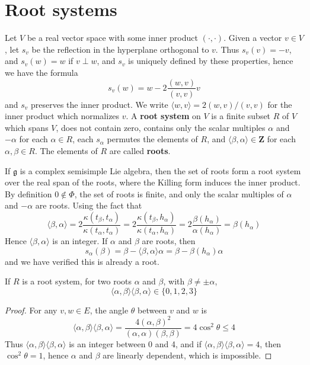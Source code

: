 \section{Root systems}

Let $V$ be a real vector space with some inner product $(\cdot,\cdot)$. Given a vector $v \in V$, let $s_v$ be the reflection in the hyperplane orthogonal to $v$. Thus $s_v(v) = -v$, and $s_v(w) = w$ if $v \perp w$, and $s_v$ is uniquely defined by these properties, hence we have the formula
%
\[ s_v(w) = w - 2 \frac{(w,v)}{(v,v)} v \]
%
and $s_v$ preserves the inner product. We write $\langle w, v \rangle = 2(w,v)/(v,v)$ for the inner product which normalizes $v$. A {\bf root system} on $V$ is a finite subset $R$ of $V$ which spans $V$, does not contain zero, contains only the scalar multiples $\alpha$ and $-\alpha$ for each $\alpha \in R$, each $s_\alpha$ permutes the elements of $R$, and $\langle \beta, \alpha \rangle \in \mathbf{Z}$ for each $\alpha, \beta \in R$. The elements of $R$ are called {\bf roots}.

\begin{example}
    If $\mathfrak{g}$ is a complex semisimple Lie algebra, then the set of roots form a root system over the real span of the roots, where the Killing form induces the inner product. By definition $0 \not \in \Phi$, the set of roots is finite, and only the scalar multiples of $\alpha$ and $-\alpha$ are roots. Using the fact that
    \[ \langle \beta, \alpha \rangle = 2 \frac{\kappa(t_\beta, t_\alpha)}{\kappa(t_\alpha, t_\alpha)} = 2 \frac{\kappa(t_\beta, h_\alpha)}{\kappa(t_\alpha, h_\alpha)} = 2 \frac{\beta(h_\alpha)}{\alpha(h_\alpha)} = \beta(h_\alpha) \]
    Hence $\langle \beta, \alpha \rangle$ is an integer. If $\alpha$ and $\beta$ are roots, then
    \[ s_\alpha(\beta) = \beta - \langle \beta, \alpha \rangle \alpha = \beta - \beta(h_\alpha) \alpha \]
    and we have verified this is already a root.
\end{example}

\begin{lemma}
    If $R$ is a root system, for two roots $\alpha$ and $\beta$, with $\beta \neq \pm \alpha$,
    \[ \langle \alpha, \beta \rangle \langle \beta, \alpha \rangle \in \{ 0, 1, 2, 3 \} \]
\end{lemma}
\begin{proof}
    For any $v,w \in E$, the angle $\theta$ between $v$ and $w$ is
    \[ \langle \alpha, \beta \rangle \langle \beta, \alpha \rangle = \frac{4 (\alpha, \beta)^2}{(\alpha, \alpha)(\beta, \beta)} = 4\cos^2 \theta \leq 4 \]
    Thus $\langle \alpha, \beta \rangle \langle \beta, \alpha \rangle$ is an integer between 0 and 4, and if $\langle \alpha, \beta \rangle \langle \beta, \alpha \rangle = 4$, then $\cos^2 \theta = 1$, hence $\alpha$ and $\beta$ are linearly dependent, which is impossible.
\end{proof}

